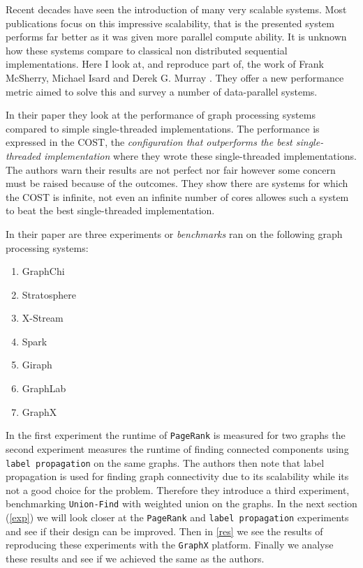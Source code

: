 Recent decades have seen the introduction of many very scalable systems. Most publications focus on this impressive scalability, that is the presented system performs far better as it was given more parallel compute ability. It is unknown how these systems compare to classical non distributed sequential implementations. Here I look at, and reproduce part of, the work of Frank McSherry, Michael Isard and Derek G. Murray \cite{189908}. They offer a new performance metric aimed to solve this and survey a number of data-parallel systems.

In their paper they look at the performance of graph processing systems compared to simple single-threaded implementations. The performance is expressed in the COST, the \textit{configuration that outperforms the best single-threaded implementation} where they wrote these single-threaded implementations. The authors warn their results are not perfect nor fair however some concern must be raised because of the outcomes. They show there are systems for which the COST is infinite, not even an infinite number of cores allowes such a system to beat the best single-threaded implementation.

In their paper are three experiments or \textit{benchmarks} ran on the following graph processing systems:

\begin{multicols}{2}
\begin{enumerate}
	\item GraphChi 
	\item Stratosphere
	\item X-Stream
	\item Spark
	\item Giraph
	\item GraphLab
	\item GraphX
\end{enumerate}
\end{multicols}

In the first experiment the runtime of \texttt{PageRank} is measured for two graphs the second experiment measures the runtime of finding connected components using \texttt{label propagation} on the same graphs. The authors then note that label propagation is used for finding graph connectivity due to its scalability while its not a good choice for the problem. Therefore they introduce a third experiment, benchmarking \texttt{Union-Find} with weighted union on the graphs. In the next section (\cref{exp}) we will look closer at the \texttt{PageRank} and \texttt{label propagation} experiments and see if their design can be improved. Then in \cref{res} we see the results of reproducing these experiments with the \texttt{GraphX} platform. Finally we analyse these results and see if we achieved the same as the authors.
